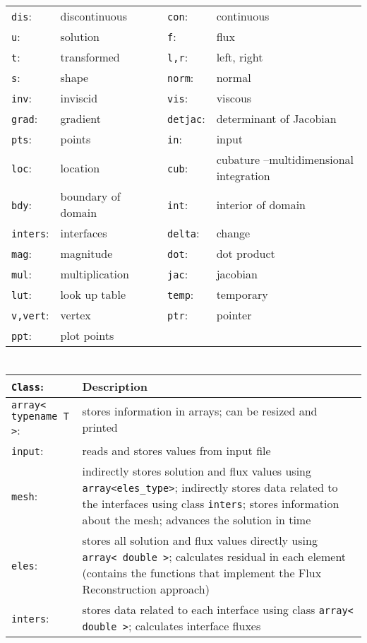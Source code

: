 \documentclass[letter,10pt]{article}
\newcommand*{\TitleFont}{%
      \usefont{\encodingdefault}{\rmdefault}{b}{n}%
      \fontsize{10}{20}%
      \selectfont}
\begin{document}
\begin{tabular}{l l l l l}
 \texttt{dis}: & discontinuous & & \texttt{con}:& continuous \\
 \texttt{u}:& solution & & \texttt{f}:& flux \\
 \texttt{t}:& transformed & & \texttt{l,r}:& left, right \\
 \texttt{s}:& shape & & \texttt{norm}:& normal \\
 \texttt{inv}:& inviscid & & \texttt{vis}:& viscous \\
 \texttt{grad}:& gradient & & \texttt{detjac}:& determinant of Jacobian \\
 \texttt{pts}:& points & & \texttt{in}:& input \\
 \texttt{loc}:& location & & \texttt{cub}:& cubature --multidimensional integration \\
 \texttt{bdy}:& boundary of domain  && \texttt{int}:& interior of domain \\
 \texttt{inters}:& interfaces & & \texttt{delta}:& change \\
 \texttt{mag}:& magnitude & & \texttt{dot}:& dot product \\
 \texttt{mul}:& multiplication & & \texttt{jac}:& jacobian \\
 \texttt{lut}:& look up table & & \texttt{temp}:& temporary \\
 \texttt{v,vert}:& vertex & & \texttt{ptr}:& pointer \\
 \texttt{ppt}:& plot points & &  \\
\end{tabular}


\section*{\TitleFont{Main Classes}}
\begin{tabular}{p{4cm} p{12cm}}
 \texttt{{\bf \centering Class}}: & {\bf  Description}\\
 \hline \texttt{array< typename T >}: & stores information in arrays; can be resized and
printed \\
\hline \texttt{input}: & reads and stores values from input file\\
 \hline \texttt{mesh}: & indirectly stores solution and flux values using
 \texttt{array<eles\_type>}; indirectly stores data related to the interfaces using class
\texttt{inters}; stores information about the mesh; advances the solution in time\\
\hline \texttt{eles}: & stores all solution and flux values directly using \texttt{array< double >};
calculates residual in each element (contains the functions that implement the Flux Reconstruction
approach)\\
\hline \texttt{inters}: & stores data related to each interface using class \texttt{array< double
>}; calculates interface fluxes
\end{tabular}
\end{document}
